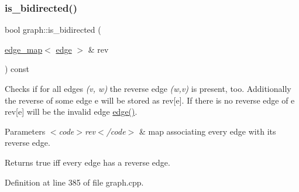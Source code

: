 \subsubsection{\texorpdfstring{is\+\_\+bidirected()}{is\_bidirected()}}
{\footnotesize\ttfamily bool graph\+::is\+\_\+bidirected (\begin{DoxyParamCaption}\item[{\mbox{\hyperlink{classedge__map}{edge\+\_\+map}}$<$ \mbox{\hyperlink{classedge}{edge}} $>$ \&}]{rev }\end{DoxyParamCaption}) const\hspace{0.3cm}{\ttfamily [inherited]}}

Checks if for all edges {\itshape (v, w)} the reverse edge {\itshape (w,v)} is present, too. Additionally the reverse of some edge {\ttfamily e} will be stored as {\ttfamily rev\mbox{[}e\mbox{]}}. If there is no reverse edge of {\ttfamily e} {\ttfamily rev\mbox{[}e\mbox{]}} will be the invalid edge {\ttfamily \mbox{\hyperlink{classedge}{edge()}}}.


\begin{DoxyParams}{Parameters}
{\em $<$code$>$rev$<$/code$>$} & map associating every edge with its reverse edge. \\
\hline
\end{DoxyParams}
\begin{DoxyReturn}{Returns}
true iff every edge has a reverse edge. 
\end{DoxyReturn}


Definition at line 385 of file graph.\+cpp.


